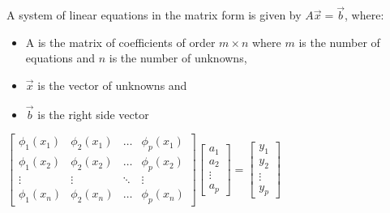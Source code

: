 \documentclass{article}
\begin{document}
\begin{multicols}{2}
	A system of linear equations in the matrix form is given by $A\vec{x} = \vec{b}$,
	where:
	\begin{itemize}
		\setlength\itemsep{0.1em}
		\item A is the matrix of coefficients of order $m \times n$ where $m$ is the number of equations
		      and $n$ is the number of unknowns,
		\item $\vec{x}$ is the vector of unknowns and
		\item $\vec{b}$ is the right side vector
	\end{itemize}
	\begin{small}
		\begin{center}
			\begin{math}
				\begin{bmatrix}
					\phi_1(x_1) & \phi_2(x_1) & \dots  & \phi_p(x_1) \\
					\phi_1(x_2) & \phi_2(x_2) & \dots  & \phi_p(x_2) \\
					\vdots      & \vdots      & \ddots & \vdots      \\
					\phi_1(x_n) & \phi_2(x_n) & \dots  & \phi_p(x_n)
				\end{bmatrix}
				\begin{bmatrix}
					a_1    \\
					a_2    \\
					\vdots \\
					a_p
				\end{bmatrix} =
				\begin{bmatrix}
					y_1    \\
					y_2    \\
					\vdots \\
					y_p
				\end{bmatrix}
			\end{math}
		\end{center}
	\end{small}


\end{multicols}
\end{document}
